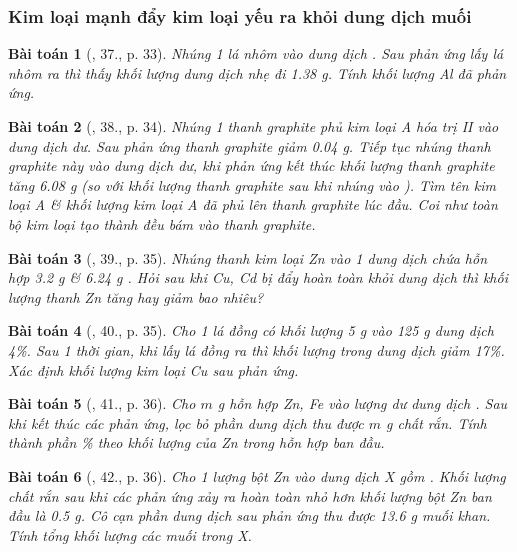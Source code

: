 \documentclass{article}
\newtheorem{baitoan}{Bài toán}
\begin{document}
\subsubsection{Kim loại mạnh đẩy kim loại yếu ra khỏi dung dịch muối}

\begin{baitoan}[\cite{An_350_BT_Hoa_Hoc_9}, 37., p. 33]
	Nhúng 1 lá nhôm vào dung dịch \emph{}. Sau phản ứng lấy lá nhôm ra thì thấy khối lượng dung dịch nhẹ đi \emph{1.38 g}. Tính khối lượng \emph{Al} đã phản ứng.
\end{baitoan}

\begin{baitoan}[\cite{An_350_BT_Hoa_Hoc_9}, 38., p. 34]
	Nhúng 1 thanh graphite phủ kim loại A hóa trị II vào dung dịch \emph{} dư. Sau phản ứng thanh graphite giảm \emph{0.04 g}. Tiếp tục nhúng thanh graphite này vào dung dịch \emph{} dư, khi phản ứng kết thúc khối lượng thanh graphite tăng \emph{6.08 g} (so với khối lượng thanh graphite sau khi nhúng vào \emph{}). Tìm tên kim loại A \& khối lượng kim loại A đã phủ lên thanh graphite lúc đầu. Coi như toàn bộ kim loại tạo thành đều bám vào thanh graphite.
\end{baitoan}

\begin{baitoan}[\cite{An_350_BT_Hoa_Hoc_9}, 39., p. 35]
	Nhúng thanh kim loại \emph{Zn} vào 1 dung dịch chứa hỗn hợp \emph{3.2 g } \& \emph{6.24 g }. Hỏi sau khi \emph{Cu, Cd} bị đẩy hoàn toàn khỏi dung dịch thì khối lượng thanh \emph{Zn} tăng hay giảm bao nhiêu?	
\end{baitoan}

\begin{baitoan}[\cite{An_350_BT_Hoa_Hoc_9}, 40., p. 35]
	Cho 1 lá đồng có khối lượng \emph{5 g} vào \emph{125 g} dung dịch \emph{ 4\%}. Sau 1 thời gian, khi lấy lá đồng ra thì khối lượng \emph{} trong dung dịch giảm \emph{17\%}. Xác định khối lượng kim loại \emph{Cu} sau phản ứng.
\end{baitoan}

\begin{baitoan}[\cite{An_350_BT_Hoa_Hoc_9}, 41., p. 36]
	Cho $m$ \emph{g} hỗn hợp \emph{Zn, Fe} vào lượng dư dung dịch \emph{}. Sau khi kết thúc các phản ứng, lọc bỏ phần dung dịch thu được $m$ \emph{g} chất rắn. Tính thành phần \% theo khối lượng của \emph{Zn} trong hỗn hợp ban đầu.
\end{baitoan}

\begin{baitoan}[\cite{An_350_BT_Hoa_Hoc_9}, 42., p. 36]
	Cho 1 lượng bột \emph{Zn} vào dung dịch X gồm \emph{}. Khối lượng chất rắn sau khi các phản ứng xảy ra hoàn toàn nhỏ hơn khối lượng bột \emph{Zn} ban đầu là \emph{0.5 g}. Cô cạn phần dung dịch sau phản ứng thu được \emph{13.6 g} muối khan. Tính tổng khối lượng các muối trong X.
\end{baitoan}
\end{document}
